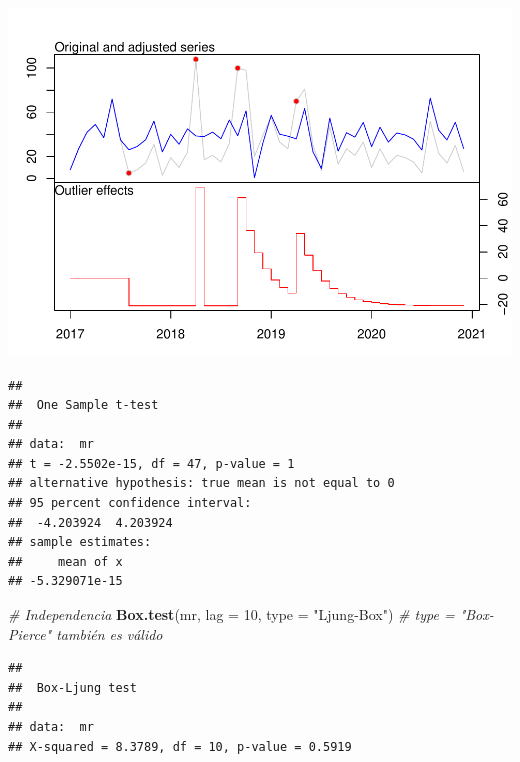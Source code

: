 \documentclass[
]{book}
\newenvironment{Shaded}{\begin{snugshade}}{\end{snugshade}}
\newcommand{\AttributeTok}[1]{\textcolor[rgb]{0.13,0.29,0.53}{#1}}
\newcommand{\CommentTok}[1]{\textcolor[rgb]{0.56,0.35,0.01}{\textit{#1}}}
\newcommand{\DecValTok}[1]{\textcolor[rgb]{0.00,0.00,0.81}{#1}}
\newcommand{\FunctionTok}[1]{\textcolor[rgb]{0.13,0.29,0.53}{\textbf{#1}}}
\newcommand{\NormalTok}[1]{#1}
\newcommand{\OtherTok}[1]{\textcolor[rgb]{0.56,0.35,0.01}{#1}}
\newcommand{\SpecialCharTok}[1]{\textcolor[rgb]{0.81,0.36,0.00}{\textbf{#1}}}
\newcommand{\StringTok}[1]{\textcolor[rgb]{0.31,0.60,0.02}{#1}}
\begin{document}
\includegraphics{_main_files/figure-latex/unnamed-chunk-21-1.pdf}

\begin{Shaded}
\end{Shaded}

\begin{verbatim}
## 
##  One Sample t-test
## 
## data:  mr
## t = -2.5502e-15, df = 47, p-value = 1
## alternative hypothesis: true mean is not equal to 0
## 95 percent confidence interval:
##  -4.203924  4.203924
## sample estimates:
##     mean of x 
## -5.329071e-15
\end{verbatim}

\begin{Shaded}
\begin{Highlighting}[]
\CommentTok{\# Independencia}
\FunctionTok{Box.test}\NormalTok{(mr, }\AttributeTok{lag =} \DecValTok{10}\NormalTok{, }\AttributeTok{type =} \StringTok{"Ljung{-}Box"}\NormalTok{) }\CommentTok{\#  type = "Box{-}Pierce" también es válido}
\end{Highlighting}
\end{Shaded}

\begin{verbatim}
## 
##  Box-Ljung test
## 
## data:  mr
## X-squared = 8.3789, df = 10, p-value = 0.5919
\end{verbatim}
\end{document}
